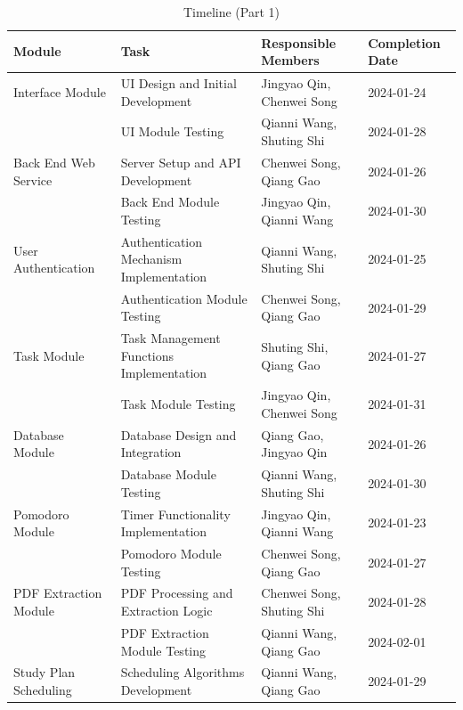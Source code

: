 \documentclass[12pt, titlepage]{article}
\begin{document}
\begin{table}[H]
\centering
\begin{tabular}{|p{}|p{}|p{}|p{}|}
\hline
\textbf{Module} & \textbf{Task} & \textbf{Responsible Members} & \textbf{Completion Date} \\
\hline
Interface Module & UI Design and Initial Development & Jingyao Qin, Chenwei Song & 2024-01-24 \\
\hline
 & UI Module Testing & Qianni Wang, Shuting Shi & 2024-01-28 \\
\hline
Back End Web Service & Server Setup and API Development & Chenwei Song, Qiang Gao & 2024-01-26 \\
\hline
 & Back End Module Testing & Jingyao Qin, Qianni Wang & 2024-01-30 \\
\hline
User Authentication & Authentication Mechanism Implementation & Qianni Wang, Shuting Shi & 2024-01-25 \\
\hline
 & Authentication Module Testing & Chenwei Song, Qiang Gao & 2024-01-29 \\
\hline
Task Module & Task Management Functions Implementation & Shuting Shi, Qiang Gao & 2024-01-27 \\
\hline
 & Task Module Testing & Jingyao Qin, Chenwei Song & 2024-01-31 \\
\hline
Database Module & Database Design and Integration & Qiang Gao, Jingyao Qin & 2024-01-26 \\
\hline
 & Database Module Testing & Qianni Wang, Shuting Shi & 2024-01-30 \\
\hline
Pomodoro Module & Timer Functionality Implementation & Jingyao Qin, Qianni Wang & 2024-01-23 \\
\hline
 & Pomodoro Module Testing & Chenwei Song, Qiang Gao & 2024-01-27 \\
\hline
PDF Extraction Module & PDF Processing and Extraction Logic & Chenwei Song, Shuting Shi & 2024-01-28 \\
\hline
 & PDF Extraction Module Testing & Qianni Wang, Qiang Gao & 2024-02-01 \\
\hline
Study Plan Scheduling & Scheduling Algorithms Development & Qianni Wang, Qiang Gao & 2024-01-29 \\
\hline
\end{tabular}
\caption{Timeline (Part 1)}
\label{table:timeline1}
\end{table}
\newpage 
\end{document}
